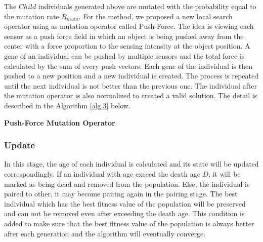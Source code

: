 \documentclass[final]{elsarticle}
\begin{document}
The $Child$ individuals generated above are mutated with the probability equal to the mutation rate $R_{muta}$. For the method, we proposed a new local search operator using as mutation operator called Push-Force. The idea is viewing each sensor as a push force field in which an object is being pushed away from the center with a force proportion to the sensing intensity at the object position. A gene of an individual can be pushed by multiple sensors and the total force is calculated by the sum of every push vectors. Each gene of the individual is then pushed to a new position and a new individual is created. The process is repeated until the next individual is not better than the previous one. The individual after the mutation operator is also normalized to created a valid solution. The detail is described in the Algorithm \ref{alg.3} below.
\begin{algorithm}[H]
	\SetAlgoLined
	\caption{\textbf{Push-Force Mutation Operator}} 
	\label{alg.3}
\end{algorithm} 

\subsubsection{Update}

In this stage, the age of each individual is calculated and its state will be updated correspondingly. If an individual with age exceed the death age $D$, it will be marked as being dead and removed from the population. Else, the individual is paired to other, it may become pairing again in the pairing stage. The best individual which has the best fitness value of the population will be preserved and can not be removed even after exceeding the death age. This condition is added to make sure that the best fitness value of the population is always better after each generation and the algorithm will eventually converge.
\end{document}
